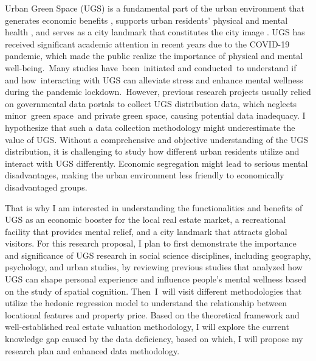 
Urban Green Space (UGS) is a fundamental part of the urban environment that generates economic benefits \parencite{kim_economic_2018}, supports urban residents’ physical and mental health \parencite{russo_modern_2018}, and serves as a city landmark that constitutes the city image \parencite{groos_millennium_2008}. UGS has received significant academic attention in recent years due to the COVID-19 pandemic, which made the public realize the importance of physical and mental well-being. Many studies have been initiated and conducted to understand if and how interacting with UGS can alleviate stress and enhance mental wellness during the pandemic lockdown. However, previous research projects usually relied on governmental data portals to collect UGS distribution data, which neglects minor green space and private green space, causing potential data inadequacy. I hypothesize that such a data collection methodology might underestimate the value of UGS. Without a comprehensive and objective understanding of the UGS distribution, it is challenging to study how different urban residents utilize and interact with UGS differently. Economic segregation might lead to serious mental disadvantages, making the urban environment less friendly to economically disadvantaged groups. 

That is why I am interested in understanding the functionalities and benefits of UGS as an economic booster for the local real estate market, a recreational facility that provides mental relief, and a city landmark that attracts global visitors. For this research proposal, I plan to first demonstrate the importance and significance of UGS research in social science disciplines, including geography, psychology, and urban studies, by reviewing previous studies that analyzed how UGS can shape personal experience and influence people’s mental wellness based on the study of spatial cognition. Then I will visit different methodologies that utilize the hedonic regression model to understand the relationship between locational features and property price. Based on the theoretical framework and well-established real estate valuation methodology, I will explore the current knowledge gap caused by the data deficiency, based on which, I will propose my research plan and enhanced data methodology.


